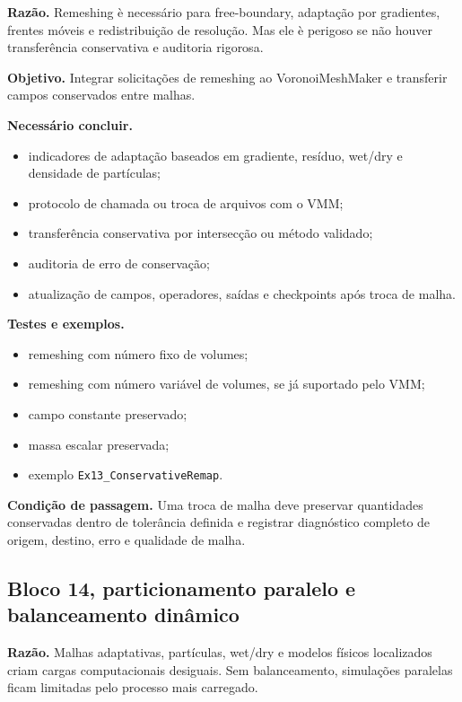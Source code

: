 \documentclass[11pt,a4paper]{article}
\begin{document}
\textbf{Raz\~ao.} Remeshing \`e necess\'ario para free-boundary, adapta\c{c}\~ao por gradientes, frentes m\'oveis e redistribui\c{c}\~ao de resolu\c{c}\~ao. Mas ele \`e perigoso se n\~ao houver transfer\^encia conservativa e auditoria rigorosa.

\textbf{Objetivo.} Integrar solicita\c{c}\~oes de remeshing ao VoronoiMeshMaker e transferir campos conservados entre malhas.

\textbf{Necess\'ario concluir.}
\begin{itemize}
  \item indicadores de adapta\c{c}\~ao baseados em gradiente, res\'iduo, wet/dry e densidade de part\'iculas;
  \item protocolo de chamada ou troca de arquivos com o VMM;
  \item transfer\^encia conservativa por intersec\c{c}\~ao ou m\'etodo validado;
  \item auditoria de erro de conserva\c{c}\~ao;
  \item atualiza\c{c}\~ao de campos, operadores, sa\'idas e checkpoints ap\'os troca de malha.
\end{itemize}

\textbf{Testes e exemplos.}
\begin{itemize}
  \item remeshing com n\'umero fixo de volumes;
  \item remeshing com n\'umero vari\'avel de volumes, se j\'a suportado pelo VMM;
  \item campo constante preservado;
  \item massa escalar preservada;
  \item exemplo \texttt{Ex13\_ConservativeRemap}.
\end{itemize}

\textbf{Condi\c{c}\~ao de passagem.} Uma troca de malha deve preservar quantidades conservadas dentro de toler\^ancia definida e registrar diagn\'ostico completo de origem, destino, erro e qualidade de malha.

\subsection*{Bloco 14, particionamento paralelo e balanceamento din\^amico}

\textbf{Raz\~ao.} Malhas adaptativas, part\'iculas, wet/dry e modelos f\'isicos localizados criam cargas computacionais desiguais. Sem balanceamento, simula\c{c}\~oes paralelas ficam limitadas pelo processo mais carregado.
\end{document}
